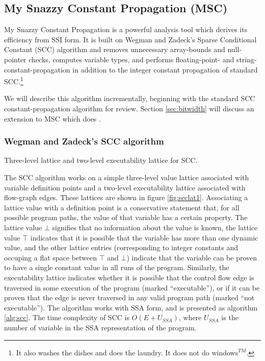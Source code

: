 \documentclass[12pt,titlepage,twoside]{article}
\newcommand*{\figscale}{1.0}
\begin{document}
\subsection{My Snazzy Constant Propagation (MSC)}
My Snazzy Constant Propagation is a powerful analysis tool which
derives its efficiency from SSI form.  It is built on Wegman and
Zadeck's Sparse Conditional Constant (SCC) algorithm
\cite{wegman91:scc} and removes unnecessary array-bounds and
null-pointer checks, computes variable types, and performs
floating-point- and string-constant-propagation in addition to the
integer constant propagation of standard SCC.\footnote{It also washes
the dishes and does the laundry.  It does not do windows$^{TM}$.}

We will describe this algorithm incrementally, beginning with the
standard SCC constant-propagation algorithm for review.  Section
\vref{sec:bitwidth} will discuss an extension to MSC which does
.

\subsubsection{Wegman and Zadeck's SCC algorithm}
\begin{myfigure}
\centering\renewcommand*{\figscale}{0.5}
\caption{Three-level lattice and two-level executability lattice for SCC.}
\label{fig:scclat1}
\end{myfigure}
The SCC algorithm works on a simple three-level value lattice
associated with variable definition points and a two-level
executability lattice associated with flow-graph edges.  These
lattices are shown in figure \vref{fig:scclat1}.  Associating a lattice
value with a definition point is a conservative statement that, for
all possible program paths, the value of that variable has a certain
property.  The lattice value $\bot$ signifies that no information
about the value is known, the lattice value $\top$ indicates that it
is possible that the variable has more than one dynamic value, and the
other lattice entries (corresponding to integer constants and occuping
a flat space between $\top$ and $\bot$) indicate that the variable can
be proven to have a single constant value in all runs of the program.
Similarly, the executability lattice indicates whether it is possible
that the control flow edge is traversed in some execution of the
program (marked ``executable''), or if it can be proven that the edge
is never traversed in any valid program path (marked ``not
executable'').  The algorithm works with SSA form, and is presented
as algorithm \ref{alg:scc}.  The time complexity of SCC is
$O(E+U_{SSA})$, where $U_{SSA}$ is the number of variable
 in the SSA representation of the program.
\end{document}
